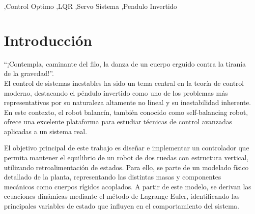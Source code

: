 \documentclass[final,times,twocolumn,5p]{ResumenEjecutivo}
\begin{document}
\begin{frontmatter}


\author[dir1]{Lucas Pin}
\author[dir1]{Matteo Martinez }
\author[dir1]{Franco de Vargas}
\address[dir1]{Estudiante de Ingeniería Mecatrónica, Facultad de Ingeniería, Universidad Nacional de Asunción, CITEC-Luque, Paraguay}

\author[dir2]{Dr. Ing. Leonardo Comparatore}
\author[dir2]{MSc. Ing. Christian Medina}
\author[dir2]{MSc. Ing. Paola Maidana}

\address[dir2]{Orientador, Facultad de Ingeniería, Universidad Nacional de Asunción, CITEC-Luque, Paraguay}


\begin{palabrasclave} 
\sep Control Optimo
\sep LQR
\sep Servo Sistema
\sep Pendulo Invertido
\end{palabrasclave}


\begin{resumen}

\end{resumen}
\end{frontmatter}
\pagestyle{fancy}

\section{Introducción}
``¡Contempla, caminante del filo, la danza de un cuerpo erguido contra la tiranía de la gravedad!''.\\

El control de sistemas inestables ha sido un tema central en la teoría de control moderno, destacando el péndulo invertido como uno de los problemas más representativos por su naturaleza altamente no lineal y su inestabilidad inherente. En este contexto, el robot balancín, también conocido como self-balancing robot, ofrece una excelente plataforma para estudiar técnicas de control avanzadas aplicadas a un sistema real.

El objetivo principal de este trabajo es diseñar e implementar un controlador que permita mantener el equilibrio de un robot de dos ruedas con estructura vertical, utilizando retroalimentación de estados. Para ello, se parte de un modelado físico detallado de la planta, representando las distintas masas y componentes mecánicos como cuerpos rígidos acoplados. A partir de este modelo, se derivan las ecuaciones dinámicas mediante el método de Lagrange-Euler, identificando las principales variables de estado que influyen en el comportamiento del sistema.
\end{document}
